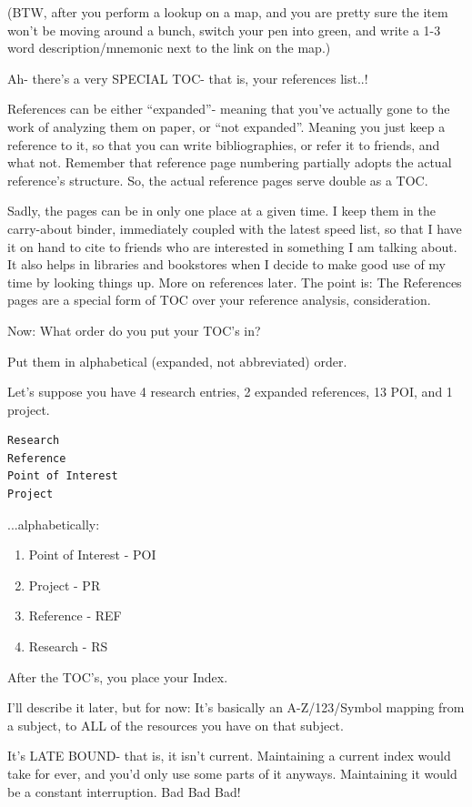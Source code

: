 \documentclass[oneside]{book}
\begin{document}
(BTW, after you perform a lookup on a map, and you are pretty sure the
item won't be moving around a bunch, switch your pen into green, and
write a 1-3 word description/mnemonic next to the link on the map.)

Ah- there's a very SPECIAL TOC- that is, your references list..!

References can be either ``expanded''- meaning that you've actually gone
to the work of analyzing them on paper, or ``not expanded''. Meaning you
just keep a reference to it, so that you can write bibliographies, or
refer it to friends, and what not. Remember that reference page
numbering partially adopts the actual reference's structure. So, the
actual reference pages serve double as a TOC.

Sadly, the pages can be in only one place at a given time. I keep them
in the carry-about binder, immediately coupled with the latest speed
list, so that I have it on hand to cite to friends who are interested
in something I am talking about. It also helps in libraries and
bookstores when I decide to make good use of my time by looking things
up. More on references later. The point is: The References pages are a
special form of TOC over your reference analysis, consideration.

Now: What order do you put your TOC's in?

Put them in alphabetical (expanded, not abbreviated) order.

Let's suppose you have 4 research entries, 2 expanded references, 13
POI, and 1 project.

\begin{verbatim}
Research
Reference
Point of Interest
Project
\end{verbatim}

...alphabetically:

\begin{enumerate}
\item Point of Interest     - POI
\item Project               - PR
\item Reference             - REF
\item Research              - RS
\end{enumerate}

After the TOC's, you place your Index.

I'll describe it later, but for now: It's basically an A-Z/123/Symbol
mapping from a subject, to ALL of the resources you have on that
subject.

It's LATE BOUND- that is, it isn't current. Maintaining a current
index would take for ever, and you'd only use some parts of it
anyways. Maintaining it would be a constant interruption. Bad Bad Bad!
\end{document}
